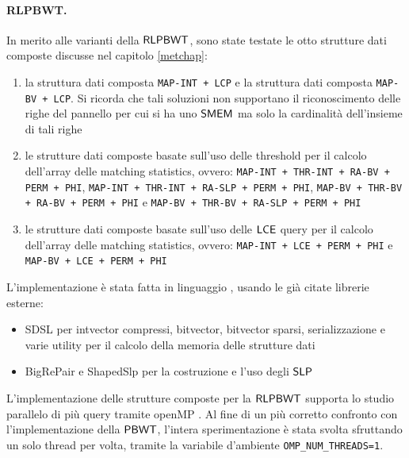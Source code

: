 \paragraph{RLPBWT.}
In merito alle varianti della $\mbox{\rm {\sf RLPBWT}}$, sono state testate le otto
strutture dati composte discusse nel capitolo \ref{metchap}:
\begin{enumerate}
  \item la struttura dati composta \texttt{MAP-INT + LCP} e la struttura dati
  composta \texttt{MAP-BV + LCP}. Si ricorda che tali soluzioni non supportano
  il riconoscimento delle righe del pannello per cui si ha uno $\mbox{\rm {\sf SMEM}}$ ma
  solo la cardinalità dell'insieme di tali righe
  \item le strutture dati composte basate sull'uso delle threshold per
  il calcolo dell'array delle matching statistics, 
  ovvero: \texttt{MAP-INT + THR-INT + RA-BV + PERM + PHI},  \texttt{MAP-INT +
    THR-INT + RA-SLP + PERM + PHI}, \texttt{MAP-BV + THR-BV + RA-BV + PERM +
    PHI} e \texttt{MAP-BV + THR-BV + RA-SLP + PERM + PHI} 
  \item le strutture dati composte basate sull'uso delle $\mbox{\rm {\sf LCE}}$ query
  per
  il calcolo dell'array delle matching statistics,
  ovvero: \texttt{MAP-INT + LCE + PERM + PHI} e \texttt{MAP-BV + LCE + PERM +
    PHI}  
\end{enumerate}
L'implementazione è stata fatta in linguaggio \Cplusplus, usando le già citate
librerie esterne:
\begin{itemize}
  \item SDSL per intvector compressi,
  bitvector, bitvector sparsi, serializzazione e varie utility
  per il calcolo della memoria delle strutture dati
  \item BigRePair e ShapedSlp per la costruzione e l'uso degli $\mbox{\rm {\sf SLP}}$ 
\end{itemize}
L'implementazione delle strutture composte per la
$\mbox{\rm {\sf RLPBWT}}$ supporta lo studio parallelo di più query tramite
openMP \cite{openmp}. Al fine di un più 
corretto confronto con l'implementazione della $\mbox{\rm {\sf PBWT}}$,
l'intera sperimentazione è stata
svolta sfruttando un solo thread per volta, tramite la variabile
d'ambiente \texttt{OMP\_NUM\_THREADS=1}.
